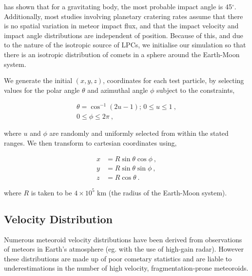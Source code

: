 \cite{shoemaker1962interpretation} has shown that for a gravitating body, the most probable impact angle is 45$^\circ$. Additionally, most studies involving planetary cratering rates assume that there is no spatial variation in meteor impact flux, and that the impact velocity and impact angle distributions are independent of position. Because of this, and due to the nature of the isotropic source of LPCs, we initialise our simulation so that there is an isotropic distribution of comets in a sphere around the Earth-Moon system.

We generate the initial $(x,y,z)$, coordinates for each test particle, by selecting values for the polar angle $\theta$ and azimuthal angle $\phi$ subject to the constraints,

\begin{equation}
  \begin{gathered}
    \theta = \cos^{-1}(2u-1); \, 0 \leq u \leq 1~, \\
    0 \leq \phi \leq 2\pi~,
\end{gathered}  
\end{equation}

where $u$ and $\phi$ are randomly and uniformly selected from within the stated ranges. We then transform to cartesian coordinates using,

\vspace{-3ex}
\begin{equation}
\begin{split}
    x &= R\sin{\theta}\cos{\phi}~, \\
    y &= R\sin{\theta}\sin{\phi}~, \\
    z &= R\cos{\theta}~.
\end{split}
\end{equation}

where $R$ is taken to be $4\times10^5$ km (the radius of the Earth-Moon system). 

\subsection{Velocity Distribution}


Numerous meteoroid velocity distributions have been derived from observations of meteors in Earth's atmosphere (eg. \cite{HUNT200434} with the use of high-gain radar). However these distributions are made up of poor cometary statistics and are liable to underestimations in the number of high velocity, fragmentation-prone meteoroids.


